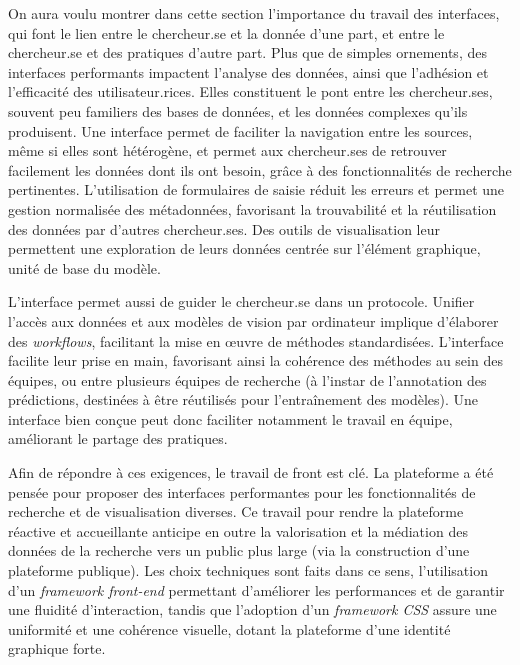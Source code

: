 On aura voulu montrer dans cette section l'importance du travail des
interfaces, qui font le lien entre le chercheur.se et la donnée d'une part,
et entre le chercheur.se et des pratiques d'autre part. Plus que de simples
ornements, des interfaces performants impactent l'analyse des données,
ainsi que l'adhésion et l'efficacité des utilisateur.rices. Elles constituent
le pont entre les chercheur.ses, souvent peu familiers des bases de
données, et les données complexes qu'ils produisent. Une interface
permet de faciliter la navigation entre les sources, même si elles sont
hétérogène, et permet aux chercheur.ses de retrouver facilement les données
dont ils ont besoin, grâce à des fonctionnalités de recherche
pertinentes. L'utilisation de formulaires de saisie réduit les erreurs
et permet une gestion normalisée des métadonnées, favorisant la
trouvabilité et la réutilisation des données par d'autres chercheur.ses.
Des outils de visualisation leur permettent une exploration de leurs données centrée sur l'élément graphique, unité de base du modèle.

L'interface permet aussi de guider le chercheur.se dans un protocole.
Unifier l'accès aux données et aux modèles de vision par ordinateur
implique d'élaborer des \textit{workflows}, facilitant la mise en œuvre de méthodes standardisées. L'interface facilite leur prise en main,
favorisant ainsi la cohérence des méthodes au sein des
équipes, ou entre plusieurs équipes de recherche (à l'instar de
l'annotation des prédictions, destinées à être réutilisés pour
l'entraînement des modèles). Une interface bien conçue peut donc
faciliter notamment le travail en équipe, améliorant le partage des pratiques.

Afin de répondre à ces exigences, le travail de front est clé. La
plateforme \aikon a été pensée pour proposer des interfaces performantes pour les fonctionnalités de recherche et de visualisation diverses. Ce travail pour rendre
la plateforme réactive et accueillante anticipe en outre la valorisation et la médiation des données de la recherche vers un public plus large (via la construction d'une plateforme
publique). Les choix techniques sont faits dans ce sens, l'utilisation
d'un \textit{framework front-end} permettant d'améliorer les performances et de
garantir une fluidité d'interaction, tandis que l'adoption d'un
\textit{framework CSS} assure une uniformité et une cohérence visuelle, dotant la
plateforme d'une identité graphique forte.